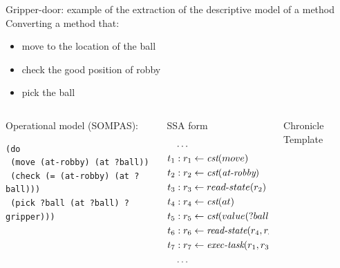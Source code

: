 \begin{frame}[c,fragile]{Gripper-door: example of the extraction of the descriptive model of a method}
    \small
    Converting a method that:
    \small
\begin{itemize}
    \item move to the location of the ball
    \item check the good position of robby
    \item pick the ball
\end{itemize}
\pause
    \begin{columns}[c, T]

        \begin{column}{0.32\textwidth}
            Operational model (SOMPAS):
            \tiny
            \begin{lstlisting}
(do
 (move (at-robby) (at ?ball))
 (check (= (at-robby) (at ?ball)))
 (pick ?ball (at ?ball) ?gripper)))
         \end{lstlisting} 
        \end{column}

        \pause
        \begin{column}{0.32\textwidth}
            SSA form
            \tiny
            \begin{align*}
                & \dots \\
        t_1 &: r_1 \leftarrow \textit{cst}(move) \\
        t_2 &: r_2 \leftarrow \textit{cst}(\textit{at-robby}) \\
        t_3 &: r_3 \leftarrow read\text{-}state(r_2) \\
        t_4 &: r_4 \leftarrow \textit{cst}(at) \\
        t_5 &: r_5 \leftarrow \textit{cst}(value(?ball)) \\
        t_6 &: r_6 \leftarrow \textit{read-state}(r_4, r_5) \\
        t_7 &: r_7 \leftarrow \textit{exec-task}(r_1, r_3, r_6) \\ 
            & \dots\\
            \end{align*}
        \end{column}
        \pause
        \begin{column}{0.32\textwidth}
        Chronicle Template
        

\end{column}
\end{columns}
\end{frame}
